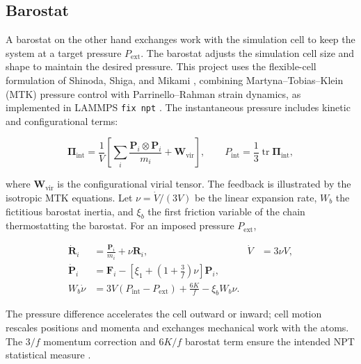 \documentclass[12pt,a4paper]{article}
\numberwithin{equation}{section}
\begin{document}
\subsection{Barostat}

A barostat on the other hand exchanges work with the simulation cell to keep the system at a target pressure $P_{\mathrm{ext}}$.
The barostat adjusts the simulation cell size and shape to maintain the desired pressure.
This project uses the flexible-cell formulation of Shinoda, Shiga, and
Mikami \cite{shinoda2004}, combining Martyna--Tobias--Klein (MTK)
pressure control \cite{mtk} with Parrinello--Rahman strain dynamics,
as implemented in LAMMPS \texttt{fix npt} \cite{lammps-npt}.
The instantaneous pressure includes kinetic and configurational terms:

\begin{equation}
  \bm\Pi_{\mathrm{int}}
    =\frac{1}{V}\left[\sum_i\frac{\bm P_i\otimes\bm P_i}{m_i}
                       +\bm W_{\mathrm{vir}}\right],\qquad
  P_{\mathrm{int}}=\frac13\operatorname{tr}\bm\Pi_{\mathrm{int}},
  \label{eq:pressure-virial}
\end{equation}

where $\bm W_{\mathrm{vir}}$ is the configurational virial tensor.
The feedback is illustrated by the isotropic MTK equations. Let
$\nu=\dot V/(3V)$ be the linear expansion rate, $W_b$ the fictitious
barostat inertia, and $\xi_b$ the first friction variable of the chain
thermostatting the barostat. For an imposed pressure $P_{\mathrm{ext}}$,

\begin{align}
  \dot{\bm R}_i&=\frac{\bm P_i}{m_i}+\nu\bm R_i,
    &\dot V&=3\nu V,\\
  \dot{\bm P}_i&=\bm F_i-
    \left[\xi_1+\left(1+\frac{3}{f}\right)\nu\right]\bm P_i,\\
  W_b\dot\nu&=3V(P_{\mathrm{int}}-P_{\mathrm{ext}})
                 +\frac{6K}{f}-\xi_b W_b\nu.
  \label{eq:mtk-isotropic}
\end{align}

The pressure difference accelerates the cell outward or inward; cell
motion rescales positions and momenta and exchanges mechanical work with
the atoms. The $3/f$ momentum correction and $6K/f$ barostat term ensure
the intended NPT statistical measure \cite{mtk}.
\end{document}
